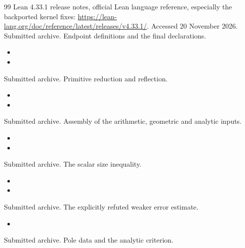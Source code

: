 \documentclass[11pt,a4paper]{article}
\theoremstyle{remark}
\begin{document}
\begin{thebibliography}{99}
Lean 4.33.1 release notes, official Lean language reference,
especially the backported kernel fixes:
\url{https://lean-lang.org/doc/reference/latest/releases/v4.33.1/}.
Accessed 20 November 2026.
Submitted archive. Endpoint definitions and the final declarations.
\begin{itemize}[leftmargin=1.4em,itemsep=0pt,topsep=1pt]
\item {}
\item {}
\end{itemize}
Submitted archive. Primitive reduction and reflection.
\begin{itemize}[leftmargin=1.4em,itemsep=0pt,topsep=1pt]
\item {}
\item {}
\end{itemize}
Submitted archive. Assembly of the arithmetic, geometric and analytic inputs.
\begin{itemize}[leftmargin=1.4em,itemsep=0pt,topsep=1pt]
\item {}
\item {}
\end{itemize}
Submitted archive. The scalar size inequality.
\begin{itemize}[leftmargin=1.4em,itemsep=0pt,topsep=1pt]
\item {}
\item {}
\end{itemize}
Submitted archive. The explicitly refuted weaker error estimate.
\begin{itemize}[leftmargin=1.4em,itemsep=0pt,topsep=1pt]
\item {}
\end{itemize}
Submitted archive. Pole data and the analytic criterion.
\begin{itemize}[leftmargin=1.4em,itemsep=0pt,topsep=1pt]

\end{itemize}
\end{thebibliography}
\end{document}
